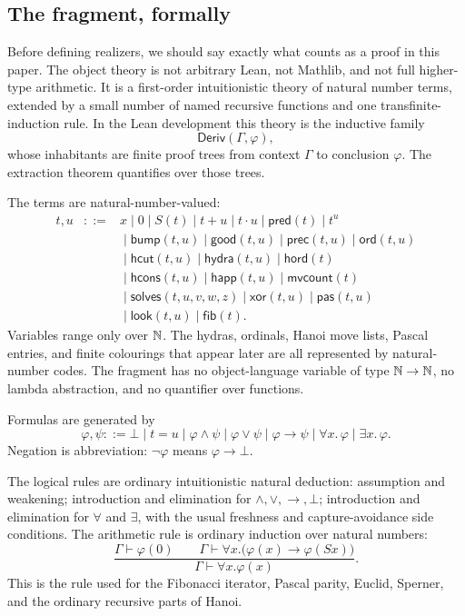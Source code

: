 \documentclass[11pt]{article}
\begin{document}
\subsection*{The fragment, formally}

Before defining realizers, we should say exactly what counts as a proof in
this paper. The object theory is not arbitrary Lean, not Mathlib, and not full
higher-type arithmetic. It is a first-order intuitionistic theory of natural
number terms, extended by a small number of named recursive functions and one
transfinite-induction rule. In the Lean development this theory is the
inductive family
\[
  \mathsf{Deriv}(\Gamma,\varphi),
\]
whose inhabitants are finite proof trees from context $\Gamma$ to conclusion
$\varphi$. The extraction theorem quantifies over those trees.

The terms are natural-number-valued:
\[
\begin{array}{rcl}
t,u &::=& x \mid 0 \mid S(t) \mid t+u \mid t\cdot u
      \mid \mathsf{pred}(t) \mid t^u                                          \\
    && {}\mid \mathsf{bump}(t,u) \mid \mathsf{good}(t,u)
      \mid \mathsf{prec}(t,u) \mid \mathsf{ord}(t,u)                          \\
    && {}\mid \mathsf{hcut}(t,u) \mid \mathsf{hydra}(t,u)
      \mid \mathsf{hord}(t)                                                    \\
    && {}\mid \mathsf{hcons}(t,u) \mid \mathsf{happ}(t,u)
      \mid \mathsf{mvcount}(t)                                                 \\
    && {}\mid \mathsf{solves}(t,u,v,w,z) \mid \mathsf{xor}(t,u)
      \mid \mathsf{pas}(t,u)                                                   \\
    && {}\mid \mathsf{look}(t,u) \mid \mathsf{fib}(t).
\end{array}
\]
Variables range only over $\mathbb{N}$. The hydras, ordinals, Hanoi move lists,
Pascal entries, and finite colourings that appear later are all represented
by natural-number codes. The fragment has no object-language variable of type
$\mathbb{N}\to\mathbb{N}$, no lambda abstraction, and no quantifier over functions.

Formulas are generated by
\[
  \varphi,\psi ::= \bot \mid t=u \mid
  \varphi\land\psi \mid \varphi\lor\psi \mid
  \varphi\to\psi \mid \forall x.\,\varphi \mid \exists x.\,\varphi .
\]
Negation is abbreviation: $\neg\varphi$ means $\varphi\to\bot$.

The logical rules are ordinary intuitionistic natural deduction: assumption
and weakening; introduction and elimination for $\land,\lor,\to,\bot$;
introduction and elimination for $\forall$ and $\exists$, with the usual
freshness and capture-avoidance side conditions. The arithmetic rule is
ordinary induction over natural numbers:
\[
  \frac{\Gamma\vdash \varphi(0)
        \qquad
        \Gamma\vdash \forall x.\bigl(\varphi(x)\to\varphi(Sx)\bigr)}
       {\Gamma\vdash \forall x.\varphi(x)}.
\]
This is the rule used for the Fibonacci iterator, Pascal parity, Euclid,
Sperner, and the ordinary recursive parts of Hanoi.
\end{document}
